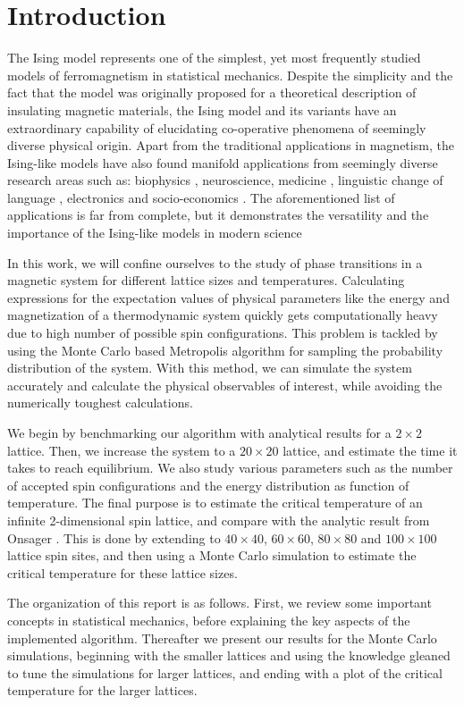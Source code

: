 \documentclass[../main.tex]{subfiles}
\begin{document}
\section{Introduction}\label{sec:introduction}
The Ising model \cite{Ising1925} represents one of the simplest, yet most frequently studied models of ferromagnetism in statistical mechanics. Despite the simplicity and the fact that the model was originally proposed for a theoretical description of insulating magnetic materials, the Ising model and its variants have an extraordinary capability of elucidating co-operative phenomena of seemingly diverse physical origin. Apart from the traditional applications in magnetism, the Ising-like models have also found manifold applications from seemingly diverse research areas \cite{StreckaJozef2015Abao} such as: biophysics \cite{MONOD196588, Thompson1968}, neuroscience, medicine \cite{TorquatoSalvatore2011TaIm}, linguistic change of language \cite{Stauffer2008}, electronics and socio-economics \cite{Stauffer2008}. The aforementioned list of applications is far from complete, but it demonstrates the versatility and the importance of the Ising-like models in modern science 

In this work, we will confine ourselves to the study of phase transitions in a magnetic system for different lattice sizes and temperatures. Calculating expressions for the expectation values of physical parameters like the energy and magnetization of a thermodynamic system quickly gets computationally heavy due to high number of possible spin configurations. This problem is tackled by using the Monte Carlo based Metropolis algorithm for sampling the probability distribution of the system. With this method, we can simulate the system accurately and calculate the physical observables of interest, while avoiding the numerically toughest calculations. 

We begin by benchmarking our algorithm with analytical results for a \ensuremath{2\times2} lattice. Then, we increase the system to a \ensuremath{20\times20} lattice, and estimate the time it takes to reach equilibrium. We also study various parameters such as the number of accepted spin configurations and the energy distribution as function of temperature. The final purpose is to estimate the critical temperature of an infinite 2-dimensional spin lattice, and compare with the analytic result from Onsager \cite{Onsager1944}. This is done by extending to $40 \times 40$, $60 \times 60$, $80 \times 80$ and $100 \times 100$ lattice spin sites, and then using a Monte Carlo simulation to estimate the critical temperature for these lattice sizes.

The organization of this report is as follows. First, we review some important concepts in statistical mechanics, before explaining the key aspects of the implemented algorithm. Thereafter we present our results for the Monte Carlo simulations, beginning with the smaller lattices and using the knowledge gleaned to tune the simulations for larger lattices, and ending with a plot of the critical temperature for the larger lattices. 
\end{document}
